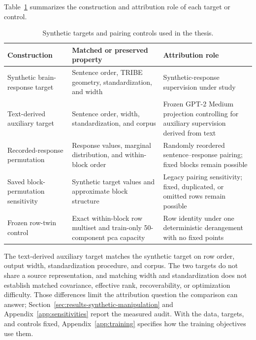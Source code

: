 Table~\ref{tab:appendix-target-controls} summarizes the construction and attribution role of each target or control.

\begin{table}[htbp]
  \centering
  \small
  \caption{Synthetic targets and pairing controls used in the thesis.}
  \label{tab:appendix-target-controls}
  \begin{tabularx}{\textwidth}{@{}>{\raggedright\arraybackslash}p{}>{\raggedright\arraybackslash}X>{\raggedright\arraybackslash}X@{}}
    \toprule
    Construction & Matched or preserved property & Attribution role \\
    \midrule
    Synthetic brain-response target & Sentence order, TRIBE geometry, standardization, and width & Synthetic-response supervision under study \\
    \midrule
    Text-derived auxiliary target & Sentence order, width, standardization, and corpus & Frozen GPT-2 Medium projection controlling for auxiliary supervision derived from text \\
    \midrule
    Recorded-response permutation & Response values, marginal distribution, and within-block order & Randomly reordered sentence--response pairing; fixed blocks remain possible \\
    \midrule
    Saved block-permutation sensitivity & Synthetic target values and approximate block structure & Legacy pairing sensitivity; fixed, duplicated, or omitted rows remain possible \\
    \midrule
    Frozen row-twin control & Exact within-block row multiset and train-only 50-component \ac{pca} capacity & Row identity under one deterministic derangement with no fixed points \\
    \bottomrule
  \end{tabularx}
\end{table}

The text-derived auxiliary target matches the synthetic target on row order, output width, standardization procedure, and corpus.
The two targets do not share a source representation, and matching width and standardization does not establish matched covariance, effective rank, recoverability, or optimization difficulty.
Those differences limit the attribution question the comparison can answer; Section~\ref{sec:results-synthetic-manipulation} and Appendix~\ref{app:sensitivities} report the measured audit.
With the data, targets, and controls fixed, Appendix~\ref{app:training} specifies how the training objectives use them.
